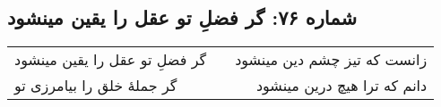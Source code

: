 \begin{center}
\section*{شماره ۷۶: گر فضلِ تو عقل را یقین مینشود}
\label{sec:076}
\begin{longtable}{l p{0.5cm} r}
گر فضلِ تو عقل را یقین مینشود
&&
زانست که تیز چشم دین مینشود
\\
گر جملهٔ خلق را بیامرزی تو
&&
دانم که ترا هیچ درین مینشود
\\
\end{longtable}
\end{center}
